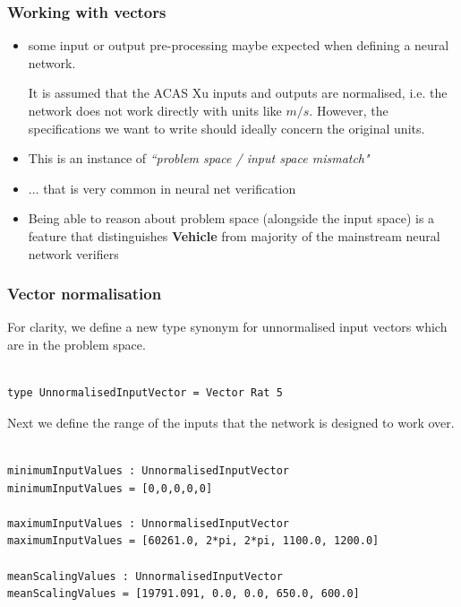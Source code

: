 \documentclass{beamer}
\begin{document}
\begin{frame}[fragile]
\frametitle{Working with vectors}
\begin{itemize}
\item some input or output pre-processing maybe expected when defining a neural network.

\begin{example}
It is assumed that the ACAS Xu inputs and outputs are normalised, i.e. the network does not work directly with units like $m/s$. However, the specifications  we want to write should ideally concern the original units.
\end{example}

\pause


\item This is an instance of \emph{``problem space / input space mismatch"} 

\item ... that is very common in neural net verification

\item
Being able to reason about problem space (alongside the input space) is a feature that distinguishes \textbf{Vehicle} from
majority of the mainstream neural network verifiers
\end{itemize}
\end{frame}

\begin{frame}[fragile]
\frametitle{Vector normalisation}
For clarity, we define a new type synonym for unnormalised input vectors which are in the problem space.
\begin{verbatim}

type UnnormalisedInputVector = Vector Rat 5

\end{verbatim}

Next we define the range of the inputs that the network is designed
to work over.

\begin{verbatim}

minimumInputValues : UnnormalisedInputVector
minimumInputValues = [0,0,0,0,0]

maximumInputValues : UnnormalisedInputVector
maximumInputValues = [60261.0, 2*pi, 2*pi, 1100.0, 1200.0]

meanScalingValues : UnnormalisedInputVector
meanScalingValues = [19791.091, 0.0, 0.0, 650.0, 600.0]
\end{verbatim}
\end{frame}
\end{document}
